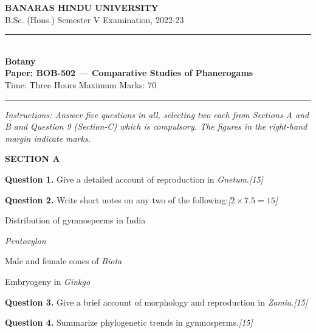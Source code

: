 \documentclass[11pt,a4paper]{article}
\newcommand{\pts}[1]{\hfill   \textit{[#1]}}
\begin{document}
\begin{center}
  {\large\bfseries BANARAS HINDU UNIVERSITY}\\[2pt]
  {\normalsize B.Sc. (Hons.) Semester V Examination, 2022-23}\\[6pt]
  \rule{0.8\linewidth}{0.5pt}\\[6pt]
  {\large\bfseries Botany}\\[4pt]
  {\large\bfseries Paper: BOB-502 --- Comparative Studies of Phanerogams}\\[4pt]
  {\normalsize Time: Three Hours \hfill Maximum Marks: 70}
\end{center}

\rule{\linewidth}{0.4pt}

\smallskip



\noindent   \textit{Instructions: Answer five questions in all, selecting two each from Sections A and B and Question 9 (Section-C) which is compulsory. The figures in the right-hand margin indicate marks.}

\bigskip


\begin{center}
   \textbf{SECTION A}
\end{center}
\medskip

\medskip


\noindent   \textbf{Question 1.} Give a detailed account of reproduction in   \textit{Gnetum}.\pts{15}

\medskip


\noindent   \textbf{Question 2.} Write short notes on any two of the following:\pts{$2  \times 7.5 = 15$}

\begin{parts}
  \item Distribution of gymnosperms in India
  \item   \textit{Pentoxylon}
  \item Male and female cones of   \textit{Biota}
  \item Embryogeny in   \textit{Ginkgo}
\end{parts}

\medskip


\noindent   \textbf{Question 3.} Give a brief account of morphology and reproduction in   \textit{Zamia}.\pts{15}

\medskip


\noindent   \textbf{Question 4.} Summarize phylogenetic trends in gymnosperms.\pts{15}

\bigskip
\end{document}
